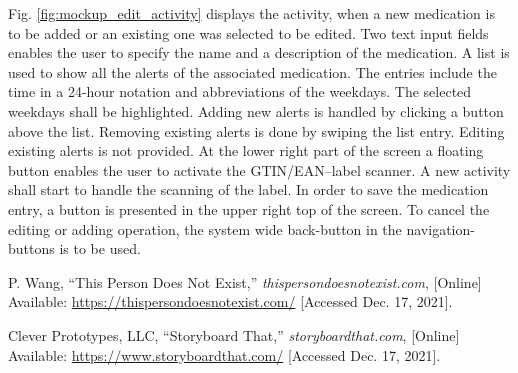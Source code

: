 \documentclass[conference]{IEEEtran}
\begin{document}
Fig. \ref{fig:mockup_edit_activity} displays the activity, when a new medication is to be added or an existing
one was selected to be edited. Two text input fields enables the user to specify the name and a description of 
the medication. A list is used to show all the alerts of the associated medication. The entries include the time
in a 24-hour notation and abbreviations of the weekdays. The selected weekdays shall be highlighted. Adding new 
alerts is handled by clicking a button above the list. Removing existing alerts is done by swiping the list entry.
Editing existing alerts is not provided. At the lower right part of the screen a floating button enables the user
to activate the GTIN/EAN--label scanner. A new activity shall start to handle the scanning of the label.
In order to save the medication entry, a button is presented in the upper right top of the screen. To cancel the
editing or adding operation, the system wide back-button in the navigation-buttons is to be used.



%
%
%
%

\newpage\hfill\newpage %
\begin{thebibliography}{00}	
	 P. Wang, ``This Person Does Not Exist,'' \textit{thispersondoesnotexist.com}, [Online] Available: \url{https://thispersondoesnotexist.com/} [Accessed Dec. 17, 2021].

	 Clever Prototypes, LLC, ``Storyboard That,'' \textit{storyboardthat.com}, [Online] Available: \url{https://www.storyboardthat.com/} [Accessed Dec. 17, 2021].

\end{thebibliography}
\end{document}

